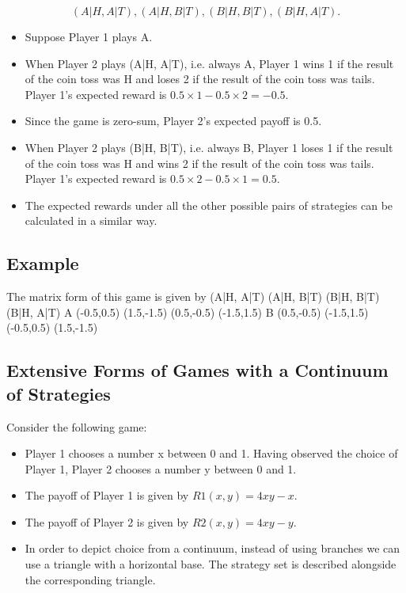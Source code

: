 \documentclass[]{report}
\begin{document}
\[(A|H, A|T), (A|H, B|T), (B|H, B|T), (B|H, A|T).\]

\begin{itemize}
	\item Suppose Player 1 plays A.
	\item	When Player 2 plays (A|H, A|T), i.e. always A, Player 1 wins 1 if
	the result of the coin toss was H and loses 2 if the result of the
	coin toss was tails. Player 1’s expected reward is
	$0.5 × 1 − 0.5 × 2 = −0.5$. 
	\item Since the game is zero-sum, Player 2’s
	expected payoff is 0.5.
	\item	When Player 2 plays (B|H, B|T), i.e. always B, Player 1 loses 1 if
	the result of the coin toss was H and wins 2 if the result of the
	coin toss was tails. Player 1’s expected reward is
	$0.5 × 2 − 0.5 × 1 = 0.5$.
	\item	The expected rewards under all the other possible pairs of
	strategies can be calculated in a similar way.
\end{itemize}


\subsection{Example}
The matrix form of this game is given by
(A|H, A|T) (A|H, B|T) (B|H, B|T) (B|H, A|T)
A (-0.5,0.5) (1.5,-1.5) (0.5,-0.5) (-1.5,1.5)
B (0.5,-0.5) (-1.5,1.5) (-0.5,0.5) (1.5,-1.5)

\subsection{Extensive Forms of Games with a Continuum of Strategies}
Consider the following game:
\begin{itemize}
	\item Player 1 chooses a number x between 0 and 1. Having observed
	the choice of Player 1, Player 2 chooses a number y between 0 and
	1.
	\item The payoff of Player 1 is given by $R1(x, y) = 4xy − x$. 
	\item The payoff
	of Player 2 is given by $R2(x, y) = 4xy − y$.
	\item In order to depict choice from a continuum, instead of using
	branches we can use a triangle with a horizontal base. The
	strategy set is described alongside the corresponding triangle.
\end{itemize}
\end{document}
